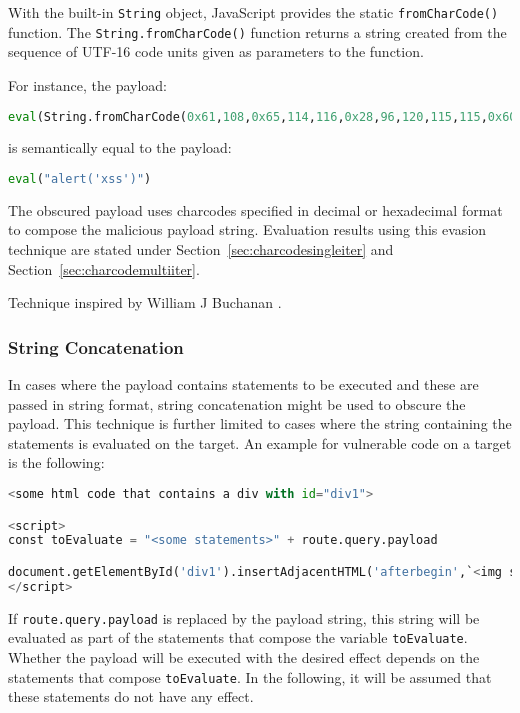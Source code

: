 With the built-in \verb|String| object, JavaScript provides the static \verb|fromCharCode()| function. The \verb|String.fromCharCode()| function returns a string created from the sequence of UTF-16 code units given as parameters to the function. \cite{js/fromCharCode}

For instance, the payload:

\begin{lstlisting}[style=basicStyle, language=Python]
eval(String.fromCharCode(0x61,108,0x65,114,116,0x28,96,120,115,115,0x60,0x29))
\end{lstlisting}

is semantically equal to the payload:

\begin{lstlisting}[style=basicStyle, language=Python]
eval("alert('xss')")
\end{lstlisting}

The obscured payload uses charcodes specified in decimal or hexadecimal format to compose the malicious payload string. Evaluation results using this evasion technique are stated under Section~\ref{sec:charcodesingleiter} and Section~\ref{sec:charcodemultiiter}.

Technique inspired by William J Buchanan \cite{asecsite/jsobf1}.

\subsubsection{String Concatenation}
\label{sec:stringconc}
In cases where the payload contains statements to be executed and these are passed in string format, string concatenation might be used to obscure the payload. This technique is further limited to cases where the string containing the statements is evaluated on the target. An example for vulnerable code on a target is the following:

\begin{lstlisting}[style=basicStyle, language=Python]
<some html code that contains a div with id="div1">

<script>
const toEvaluate = "<some statements>" + route.query.payload

document.getElementById('div1').insertAdjacentHTML('afterbegin',`<img src=0 onerror=${eval(toEvaluate)}>`)
</script>
\end{lstlisting}

If \verb|route.query.payload| is replaced by the payload string, this string will be evaluated as part of the statements that compose the variable \verb|toEvaluate|. Whether the payload will be executed with the desired effect depends on the statements that compose \verb|toEvaluate|. In the following, it will be assumed that these statements do not have any effect.

